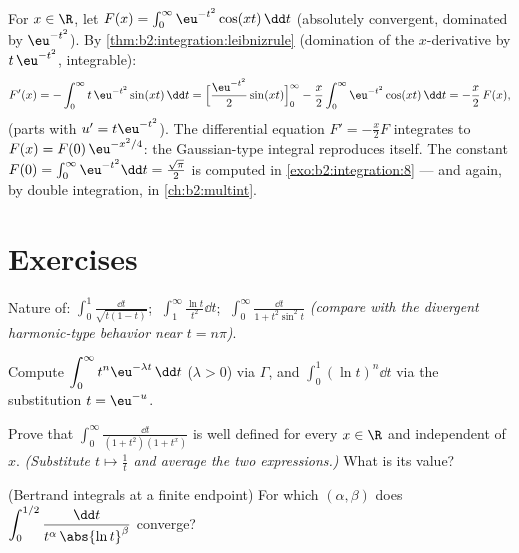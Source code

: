 \begin{example}\label{ex:b2:integration:laplace}
For $x \in \R$, let $F(x) = \int_0^{\infty} \eu^{-t^2}\cos(xt)\,\dd
t$ (absolutely convergent, dominated by $\eu^{-t^2}$). By
\cref{thm:b2:integration:leibnizrule} (domination of the
$x$-derivative by $t\,\eu^{-t^2}$, integrable):
\[
F'(x) = -\int_0^\infty t\,\eu^{-t^2}\sin(xt)\,\dd t
= \Bigl[\frac{\eu^{-t^2}}{2}\sin(xt)\Bigr]_0^\infty
- \frac x2\int_0^\infty \eu^{-t^2}\cos(xt)\,\dd t
= -\frac x2\,F(x),
\]
(parts with $u' = t\eu^{-t^2}$). The differential equation $F' =
-\frac x2 F$ integrates to $F(x) = F(0)\,\eu^{-x^2/4}$: the
Gaussian-type integral reproduces itself. The constant $F(0) =
\int_0^\infty \eu^{-t^2}\dd t = \frac{\sqrt\pi}{2}$ is computed in
\cref{exo:b2:integration:8} --- and again, by double integration,
in \cref{ch:b2:multint}.
\end{example}

\section{Exercises}

\begin{exercise}[$\star$]\label{exo:b2:integration:1}
Nature of:
$\displaystyle\int_0^1 \frac{\dd t}{\sqrt{t(1-t)}}$;
$\;\displaystyle\int_1^\infty \frac{\ln t}{t^2}\dd t$;
$\;\displaystyle\int_0^\infty \frac{\dd t}{1 + t^2\sin^2 t}$
\emph{(compare with the divergent harmonic-type behavior near $t =
n\pi$)}.
\end{exercise}

\begin{exercise}[$\star$]\label{exo:b2:integration:2}
Compute $\displaystyle\int_0^\infty t^n \eu^{-\lambda t}\,\dd t$
($\lambda > 0$) via $\Gamma$, and
$\displaystyle\int_0^1 (\ln t)^n \dd t$ via the substitution $t =
\eu^{-u}$.
\end{exercise}

\begin{exercise}[$\star$]\label{exo:b2:integration:3}
Prove that $\displaystyle\int_0^{\infty} \frac{\dd t}{(1 +
t^2)(1 + t^x)}$ is well defined for every $x \in \R$ and
independent of $x$. \emph{(Substitute $t \mapsto \frac1t$ and
average the two expressions.)} What is its value?
\end{exercise}

\begin{exercise}[$\star\star$]\label{exo:b2:integration:4}
(Bertrand integrals at a finite endpoint) For which $(\alpha,
\beta)$ does $\displaystyle\int_0^{1/2}
\frac{\dd t}{t^\alpha\,\abs{\ln t}^\beta}$ converge?
\end{exercise}

